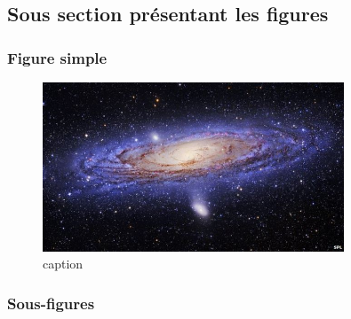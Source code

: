 \subsection{Sous section présentant les figures}

\subsubsection{Figure simple}

\blindtext[3]
\begin{figure}[htbp]
    \centering
    \includegraphics[width=0.8\textwidth]{./image1.jpg}
    \caption{caption}%
    \label{}
\end{figure}

\subsubsection{Sous-figures}

